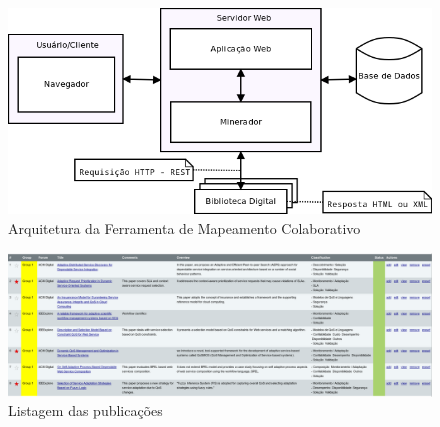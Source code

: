 \begin{figure}[htb]
\centering
\includegraphics[scale=0.37]{figuras/system_architecture.png}
\caption{Arquitetura da Ferramenta de Mapeamento Colaborativo}
\label{fig:system_architecture}
\end{figure}


\begin{figure}[htb]
\centering
\includegraphics[scale=0.32]{figuras/Support_Tool_02.png}
\caption{Listagem das publicações}
\label{fig:support_tool_02}
\end{figure}

